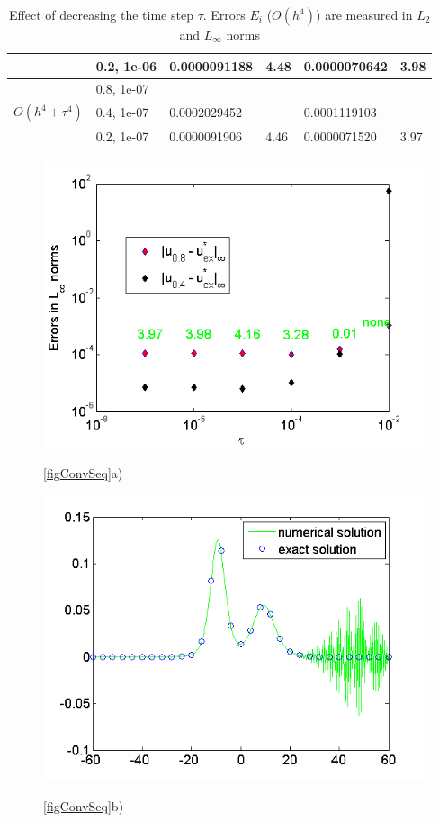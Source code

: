 \documentclass[%
 aip,
cp,  
 amsmath,amssymb,
 reprint,
]{iopconfser}
\begin{document}
\begin{table}[ht]
\begin{tabular}{||c|l|ll|ll||}
                    &0.2, 1e-06  & 0.0000091188 & 4.48  &0.0000070642 &      3.98    \\
    \hline
                    &0.8, 1e-07          &              &              &                     &      \\
       $O(h^4 + \tau^ 4)$                  &0.4, 1e-07          &0.0002029452 &            & 0.0001119103    &       \\
   &0.2, 1e-07  & 0.0000091906 & 4.46  &0.0000071520 &       3.97    \\
    \hline
			\hline 
		\end{tabular}
		\caption{Effect of decreasing the time step $\tau$. Errors $E_i$ ($O(h^{4})$) are measured in $L_2$ and $L_\infty$ norms}
\label{tableConvSeq}
\end{table}
\fi
\begin{figure}%
	\begin{minipage}[b]{0.46\linewidth}
		\raggedleft
		\includegraphics[width=\linewidth]{ConvergenceDecreaseTau.png}
		\centerline{\ref{figConvSeq}a) }
	\end{minipage}	
	\begin{minipage}[b]{0.46\linewidth}
		\raggedright
		 \includegraphics[width=\linewidth]{endSolNumSolDiverg.png}
		\centerline{\ref{figConvSeq}b) }
	\end{minipage}


\end{figure}
\end{document}
